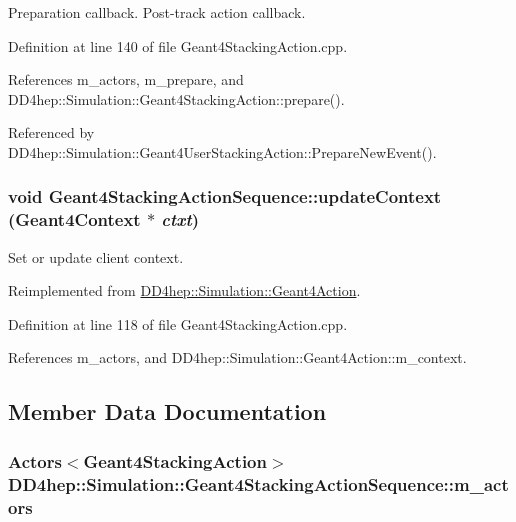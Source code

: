 Preparation callback. Post-\/track action callback. 

Definition at line 140 of file Geant4StackingAction.cpp.

References m\_\-actors, m\_\-prepare, and DD4hep::Simulation::Geant4StackingAction::prepare().

Referenced by DD4hep::Simulation::Geant4UserStackingAction::PrepareNewEvent().\hypertarget{class_d_d4hep_1_1_simulation_1_1_geant4_stacking_action_sequence_a093447274a6d135bc1d69fe96ed0961c}{
\subsubsection[{updateContext}]{\setlength{\rightskip}{0pt plus 5cm}void Geant4StackingActionSequence::updateContext ({\bf Geant4Context} $\ast$ {\em ctxt})}}
\label{class_d_d4hep_1_1_simulation_1_1_geant4_stacking_action_sequence_a093447274a6d135bc1d69fe96ed0961c}


Set or update client context. 

Reimplemented from \hyperlink{class_d_d4hep_1_1_simulation_1_1_geant4_action_ae3b9daf2af881df956c46568c0743313}{DD4hep::Simulation::Geant4Action}.

Definition at line 118 of file Geant4StackingAction.cpp.

References m\_\-actors, and DD4hep::Simulation::Geant4Action::m\_\-context.

\subsection{Member Data Documentation}
\hypertarget{class_d_d4hep_1_1_simulation_1_1_geant4_stacking_action_sequence_af1288d59daee21aca2f409b9dc629a04}{
\subsubsection[{m\_\-actors}]{\setlength{\rightskip}{0pt plus 5cm}Actors$<${\bf Geant4StackingAction}$>$ {\bf DD4hep::Simulation::Geant4StackingActionSequence::m\_\-actors}}}
\label{class_d_d4hep_1_1_simulation_1_1_geant4_stacking_action_sequence_af1288d59daee21aca2f409b9dc629a04}


